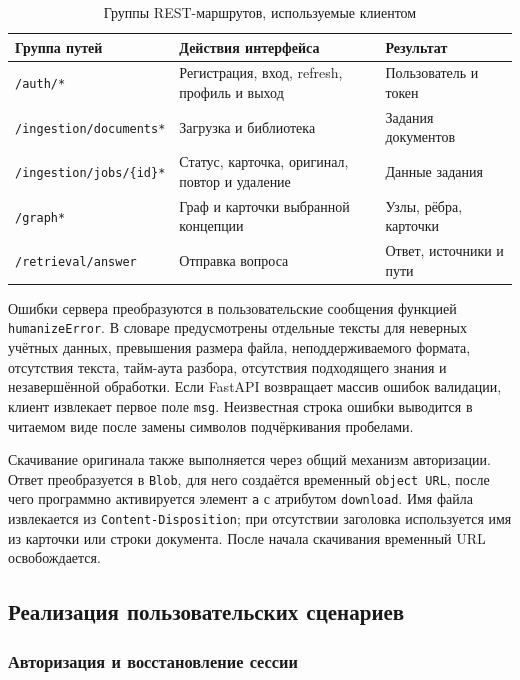 \begin{table}[h!]
\caption{Группы REST-маршрутов, используемые клиентом}
\label{tab:frontend_api_routes}
\begin{tabularx}{\textwidth}{|X|X|X|}
\hline
\textbf{Группа путей} & \textbf{Действия интерфейса} & \textbf{Результат} \\
\hline
\texttt{/auth/*} & Регистрация, вход, refresh, профиль и выход & Пользователь и токен \\
\hline
\texttt{/ingestion/documents*} & Загрузка и библиотека & Задания документов \\
\hline
\texttt{/ingestion/jobs/\{id\}*} & Статус, карточка, оригинал, повтор и удаление & Данные задания \\
\hline
\texttt{/graph*} & Граф и карточки выбранной концепции & Узлы, рёбра, карточки \\
\hline
\texttt{/retrieval/answer} & Отправка вопроса & Ответ, источники и пути \\
\hline
\end{tabularx}
\end{table}

Ошибки сервера преобразуются в пользовательские сообщения функцией \texttt{humanizeError}. В словаре предусмотрены отдельные тексты для неверных учётных данных, превышения размера файла, неподдерживаемого формата, отсутствия текста, тайм-аута разбора, отсутствия подходящего знания и незавершённой обработки. Если FastAPI возвращает массив ошибок валидации, клиент извлекает первое поле \texttt{msg}. Неизвестная строка ошибки выводится в читаемом виде после замены символов подчёркивания пробелами.

Скачивание оригинала также выполняется через общий механизм авторизации. Ответ преобразуется в \texttt{Blob}, для него создаётся временный \texttt{object URL}, после чего программно активируется элемент \texttt{a} с атрибутом \texttt{download}. Имя файла извлекается из \texttt{Content-Disposition}; при отсутствии заголовка используется имя из карточки или строки документа. После начала скачивания временный URL освобождается.

\subsection{Реализация пользовательских сценариев}

\subsubsection{Авторизация и восстановление сессии}

